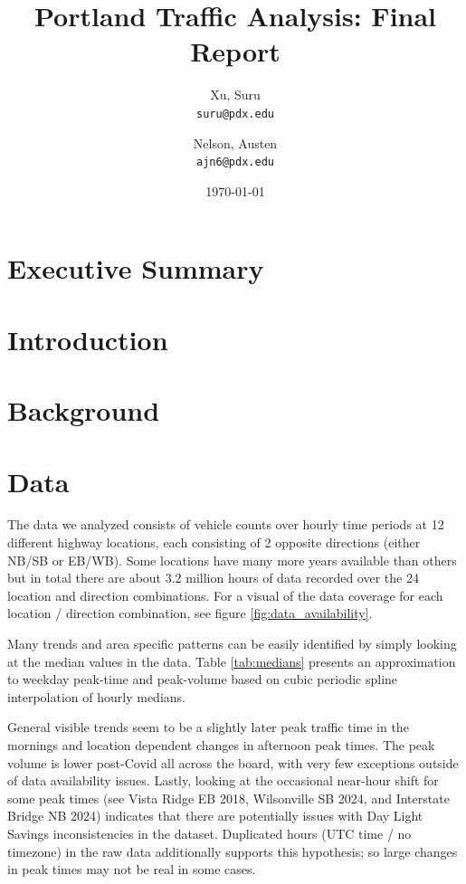 \documentclass{article}
\title{Portland Traffic Analysis: Final Report}
\author{
  Xu, Suru\\
  \texttt{suru@pdx.edu}
  \and
  Nelson, Austen\\
  \texttt{ajn6@pdx.edu}
}
\date{\today}
\begin{document}
\maketitle

\tableofcontents

\section{Executive Summary}

\section{Introduction}

\section{Background}

\section{Data}

The data we analyzed consists of vehicle counts over hourly time periods at 12 different highway locations, each consisting of 2 opposite directions (either NB/SB or EB/WB). Some locations have many more years available than others but in total there are about 3.2 million hours of data recorded over the 24 location and direction combinations. For a visual of the data coverage for each location / direction combination, see figure \ref{fig:data_availability}.

Many trends and area specific patterns can be easily identified by simply looking at the median values in the data. Table \ref{tab:medians} presents an approximation to weekday peak-time and peak-volume based on cubic periodic spline interpolation of hourly medians. 

General visible trends seem to be a slightly later peak traffic time in the mornings and location dependent changes in afternoon peak times. The peak volume is lower post-Covid all across the board, with very few exceptions outside of data availability issues. Lastly, looking at the occasional near-hour shift for some peak times (see Vista Ridge EB 2018, Wilsonville SB 2024, and Interstate Bridge NB 2024) indicates that there are potentially issues with Day Light Savings inconsistencies in the dataset. Duplicated hours (UTC time / no timezone) in the raw data additionally supports this hypothesis; so large changes in peak times may not be real in some cases.
\end{document}

